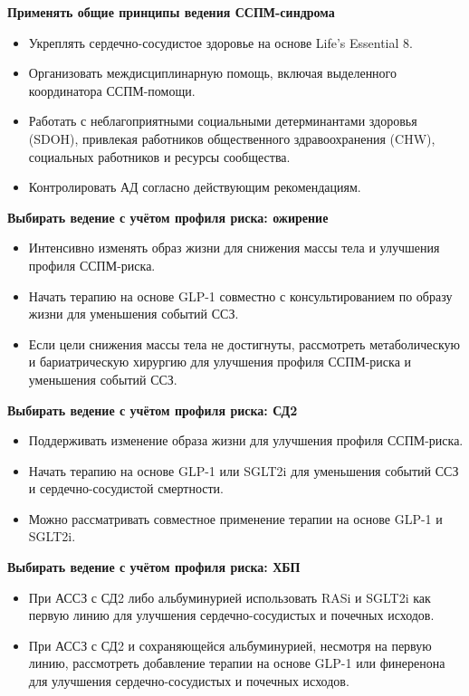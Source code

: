 \documentclass[11pt,a4paper]{article}
\newcommand{\heading}[1]{\par\medskip\textbf{#1}\par}
\begin{document}
\heading{Применять общие принципы ведения ССПМ-синдрома}
\begin{itemize}
\item Укреплять сердечно-сосудистое здоровье на основе Life's Essential 8.
\item Организовать междисциплинарную помощь, включая выделенного координатора ССПМ-помощи.
\item Работать с неблагоприятными социальными детерминантами здоровья (SDOH), привлекая работников общественного здравоохранения (CHW), социальных работников и ресурсы сообщества.
\item Контролировать АД согласно действующим рекомендациям.
\end{itemize}

\heading{Выбирать ведение с учётом профиля риска: ожирение}
\begin{itemize}
\item Интенсивно изменять образ жизни для снижения массы тела и улучшения профиля ССПМ-риска.
\item Начать терапию на основе GLP-1 совместно с консультированием по образу жизни для уменьшения событий ССЗ.
\item Если цели снижения массы тела не достигнуты, рассмотреть метаболическую и бариатрическую хирургию для улучшения профиля ССПМ-риска и уменьшения событий ССЗ.
\end{itemize}

\heading{Выбирать ведение с учётом профиля риска: СД2}
\begin{itemize}
\item Поддерживать изменение образа жизни для улучшения профиля ССПМ-риска.
\item Начать терапию на основе GLP-1 или SGLT2i для уменьшения событий ССЗ и сердечно-сосудистой смертности.
\item Можно рассматривать совместное применение терапии на основе GLP-1 и SGLT2i.
\end{itemize}

\heading{Выбирать ведение с учётом профиля риска: ХБП}
\begin{itemize}
\item При АССЗ с СД2 либо альбуминурией использовать RASi и SGLT2i как первую линию для улучшения сердечно-сосудистых и почечных исходов.
\item При АССЗ с СД2 и сохраняющейся альбуминурией, несмотря на первую линию, рассмотреть добавление терапии на основе GLP-1 или финеренона для улучшения сердечно-сосудистых и почечных исходов.
\end{itemize}
\end{document}
